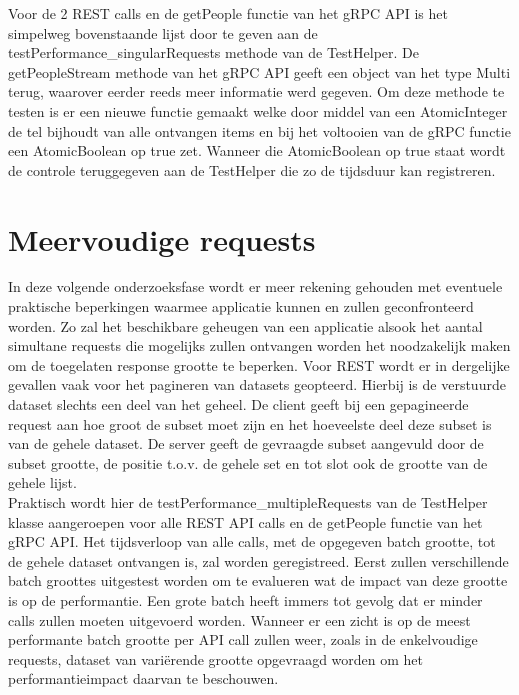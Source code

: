 Voor de 2 REST calls en de getPeople functie van het gRPC API is het simpelweg bovenstaande lijst door te geven aan de testPerformance\_singularRequests methode
van de TestHelper. De getPeopleStream methode van het gRPC API geeft een object van het type Multi terug, waarover eerder reeds meer informatie werd gegeven.
Om deze methode te testen is er een nieuwe functie gemaakt welke door middel van een AtomicInteger de tel bijhoudt van alle ontvangen items en bij het voltooien van
de gRPC functie een AtomicBoolean op true zet. Wanneer die AtomicBoolean op true staat wordt de controle teruggegeven aan de TestHelper die zo de tijdsduur kan registreren.\\

\section{Meervoudige requests}

In deze volgende onderzoeksfase wordt er meer rekening gehouden met eventuele praktische beperkingen waarmee applicatie kunnen en zullen geconfronteerd worden.
Zo zal het beschikbare geheugen van een applicatie alsook het aantal simultane requests die mogelijks zullen ontvangen worden het noodzakelijk maken om
de toegelaten response grootte te beperken. Voor REST wordt er in dergelijke gevallen vaak voor het pagineren van datasets geopteerd.
Hierbij is de verstuurde dataset slechts een deel van het geheel. De client geeft bij een gepagineerde request aan hoe groot de subset moet zijn
en het hoeveelste deel deze subset is van de gehele dataset. De server geeft de gevraagde subset aangevuld door de subset grootte, de positie t.o.v. de gehele set
en tot slot ook de grootte van de gehele lijst.\\

Praktisch wordt hier de testPerformance\_multipleRequests van de TestHelper klasse aangeroepen voor alle REST API calls en de getPeople functie van het gRPC API.
Het tijdsverloop van alle calls, met de opgegeven batch grootte, tot de gehele dataset ontvangen is, zal worden geregistreed. Eerst zullen verschillende batch groottes
uitgestest worden om te evalueren wat de impact van deze grootte is op de performantie. Een grote batch heeft immers tot gevolg dat er minder calls zullen moeten uitgevoerd worden.
Wanneer er een zicht is op de meest performante batch grootte per API call zullen weer, zoals in de enkelvoudige requests, dataset van vari\"erende grootte opgevraagd
worden om het performantieimpact daarvan te beschouwen.\\

